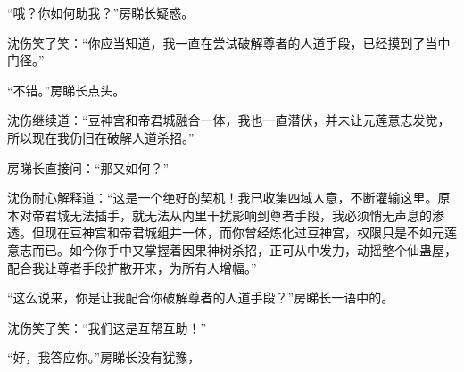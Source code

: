 \begin{this_body}
“哦？你如何助我？”房睇长疑惑。

沈伤笑了笑：“你应当知道，我一直在尝试破解尊者的人道手段，已经摸到了当中门径。”

“不错。”房睇长点头。

沈伤继续道：“豆神宫和帝君城融合一体，我也一直潜伏，并未让元莲意志发觉，所以现在我仍旧在破解人道杀招。”

房睇长直接问：“那又如何？”

沈伤耐心解释道：“这是一个绝好的契机！我已收集四域人意，不断灌输这里。原本对帝君城无法插手，就无法从内里干扰影响到尊者手段，我必须悄无声息的渗透。但现在豆神宫和帝君城组并一体，而你曾经炼化过豆神宫，权限只是不如元莲意志而已。如今你手中又掌握着因果神树杀招，正可从中发力，动摇整个仙蛊屋，配合我让尊者手段扩散开来，为所有人增幅。”

“这么说来，你是让我配合你破解尊者的人道手段？”房睇长一语中的。

沈伤笑了笑：“我们这是互帮互助！”

“好，我答应你。”房睇长没有犹豫，

\end{this_body}

